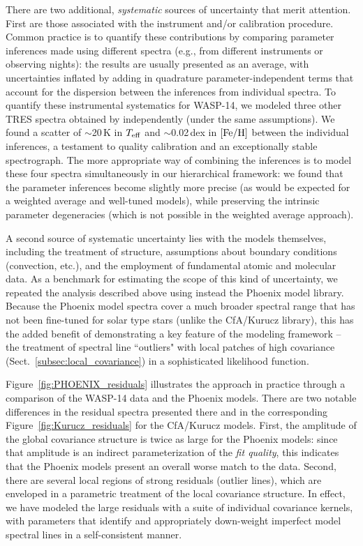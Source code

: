 \documentclass[iop,floatfix,twocolappendix]{emulateapj}
\newcommand{\Z}{[{\rm Fe}/{\rm H}]}
\begin{document}
There are two additional, {\it systematic} sources of uncertainty that merit attention.  First are 
those associated with the instrument and/or calibration procedure.  Common practice is to quantify 
these contributions by comparing parameter inferences made using different spectra (e.g., from 
different instruments or observing nights): the results are usually presented as an average, with 
uncertainties inflated by adding in quadrature parameter-independent terms that account for the 
dispersion between the inferences from individual spectra.  To quantify these instrumental 
systematics for WASP-14, we modeled three other TRES spectra obtained by \citet{torres12} 
independently (under the same assumptions).  We found a scatter of $\sim$20\,K in $T_{\rm eff}$ and 
$\sim$0.02\,dex in $\Z$ between the individual inferences, a testament to quality calibration and 
an exceptionally stable spectrograph.  The more appropriate way of combining the inferences is to 
model these four spectra simultaneously in our hierarchical framework: we found that the parameter 
inferences become slightly more precise (as would be expected for a weighted average and well-tuned 
models), while preserving the intrinsic parameter degeneracies (which is not possible in the 
weighted average approach).

A second source of systematic uncertainty lies with the models themselves, including the treatment 
of structure, assumptions about boundary conditions (convection, etc.), and the employment of 
fundamental atomic and molecular data.  As a benchmark for estimating the scope of this kind of 
uncertainty, we repeated the analysis described above using instead the {\sc Phoenix} model 
library.  Because the {\sc Phoenix} model spectra cover a much broader spectral range that has not 
been fine-tuned for solar type stars (unlike the {\sc CfA/Kurucz} library), this has the added 
benefit of demonstrating a key feature of the modeling framework -- the treatment of spectral line 
``outliers" with local patches of high covariance (Sect.~\ref{subsec:local_covariance}) in a 
sophisticated likelihood function.  

Figure~\ref{fig:PHOENIX_residuals} illustrates the approach in practice through a comparison of the 
WASP-14 data and the {\sc Phoenix} models.  There are two notable differences in the residual 
spectra presented there and in the corresponding Figure~\ref{fig:Kurucz_residuals} for the {\sc 
CfA/Kurucz} models.  First, the amplitude of the global covariance structure is twice as large for 
the {\sc Phoenix} models: since that amplitude is an indirect parameterization of the {\it fit 
quality}, this indicates that the {\sc Phoenix} models present an overall worse match to the 
data.  Second, there are several local regions of strong residuals (outlier lines), which are 
enveloped in a parametric treatment of the local covariance structure.  In effect, we have modeled 
the large residuals with a suite of individual covariance kernels, with parameters that identify 
and appropriately down-weight imperfect model spectral lines in a self-consistent manner.
\end{document}
